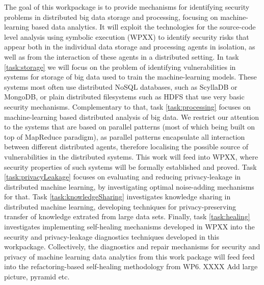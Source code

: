 \begin{Workpackage}{\thewpno}
\begin{WPDescription}
  The goal of this workpackage is to provide mechanisms for identifying security problems in distributed big data storage and processing, focusing on machine-learning based data analytics. It will exploit the technologies for the source-code level analysis using symbolic execution (WPXX) to identify security risks that appear both in the individual data storage and processing agents in isolation, as well as from the interaction of these agents in a distributed setting. In task \ref{task:storage} we will focus on the problem of identifying vulnerabilities in systems for storage of big data used to train the machine-learning models. These systems most often use distributed NoSQL databases, such as ScyllaDB or MongoDB, or plain distributed filesystems such as HDFS that use very basic security mechanisms. Complementary to that, task \ref{task:processing} focuses on machine-learning based distributed analysis of big data. We restrict our attention to the systems that are based on parallel patterns (most of which being built on top of MapReduce paradigm), as parallel patterns encapsulate all interaction between different distributed agents, therefore localising the possible source of vulnerabilities in the distributed systems. This work will feed into WPXX, where security properties of such systems will be formally established and proved. Task \ref{task:privacyLeakage} focuses on evaluating and reducing privacy-leakage in distributed machine learning, by investigating optimal noise-adding mechanisms for that. Task \ref{task:knowledgeSharing} investigates knowledge sharing in distributed machine learning, developing techniques for privacy-preserving transfer of knowledge extrated from large data sets. Finally, task \ref{task:healing} investigates implementing self-healing mechanisms developed in WPXX into the security and privacy-leakage diagnostics techniques developed in this workpackage. Collectively, the diagnostics and repair mechanisms for security and privacy of machine learning data analytics from this work package will feed feed into the refactoring-based self-healing methodology from WP6.   XXXX   Add large picture, pyramid etc. 
\end{WPDescription}

\begin{Task}


\end{Task}
\end{Workpackage}
